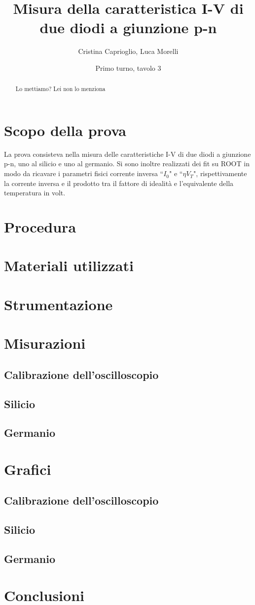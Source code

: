 \documentclass[]{article}
\title{Misura della caratteristica I-V di due diodi a giunzione p-n}
\author{Cristina Caprioglio, Luca Morelli}
\date{Primo turno, tavolo 3}
\begin{document}
\maketitle

\begin{abstract}
Lo mettiamo? Lei non lo menziona
\end{abstract}

\section{Scopo della prova}
La prova consisteva nella misura delle caratteristiche I-V di due diodi a giunzione p-n, uno al silicio e uno al germanio. Si sono inoltre realizzati dei fit su ROOT in modo da ricavare i parametri fisici corrente inversa ``$  I_{0}$" e ``$\eta V_{T}$", rispettivamente la corrente inversa e il prodotto tra il fattore di idealità e l'equivalente della temperatura in volt. 
\section{Procedura}
\section{Materiali utilizzati}
\section{Strumentazione}
\section{Misurazioni}
\subsection{Calibrazione dell'oscilloscopio}
\subsection{Silicio}
\subsection{Germanio}
\section{Grafici}
\subsection{Calibrazione dell'oscilloscopio}
\subsection{Silicio}
\subsection{Germanio}
\section*{Conclusioni}
\end{document}

